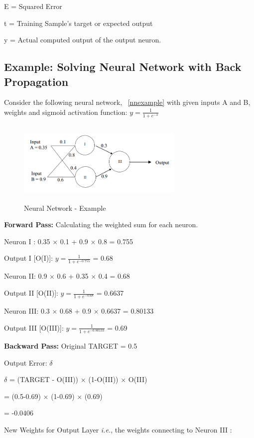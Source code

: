 E = Squared Error

t = Training Sample's target or expected output

y = Actual computed output of the output neuron.
	

\subsection{Example: Solving Neural Network with Back Propagation}
Consider the following neural network, ~\autoref{nnexample} with given inputs A and B, weights and sigmoid activation function:
$y=\frac{1}{1+e^{-x}}$
\begin{figure}[ht!]
	\centering
		\includegraphics[height=40mm,  width=80mm]{figures/3_nnexample.png}
		\caption[Neural Network - Example]{Neural Network - Example}
			\label{nnexample}
\end{figure}

\textbf{Forward Pass:} Calculating the weighted sum for each neuron.
	
Neuron I : 0.35 $\times$ 0.1 + 0.9 $\times$ 0.8 = 0.755
	
Output I [O(I)]:   $y=\frac{1}{1+e^{-0.755}}$ = 0.68
	
Neuron II: 0.9 $\times$ 0.6 + 0.35 $\times$ 0.4 = 0.68
	
Output II [O(II)]: $y=\frac{1}{1+e^{-0.68}}$ =  0.6637
	
Neuron III: 0.3 $\times$ 0.68 + 0.9 $\times$ 0.6637 = 0.80133
	
Output III [O(III)]: $y=\frac{1}{1+e^{-0.80133}}$ = 0.69
\newline
	
\textbf{Backward Pass:} Original TARGET = 0.5
	
Output Error: $\delta$
	
$\delta$ = (TARGET - O(III)) $\times$ (1-O(III)) $\times$ O(III)

= (0.5-0.69) $\times$ (1-0.69) $\times$ (0.69)
	
= -0.0406
	
New Weights for Output Layer \textit{i.e.}, the weights connecting to Neuron III :
	
